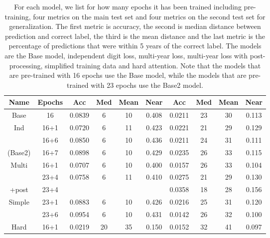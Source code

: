 
\begin{table}
  \centering
  \begin{tabular}{|c|c||c|c|c|c||c|c|c|c|}
    \hline
    Name & Epochs & Acc & Med & Mean & Near & Acc & Med & Mean & Near \\
    \hline
    Base & 16 & 0.0839 & 6 & 10 & 0.408 & 0.0211 & 23 & 30 & 0.113 \\
    \hline
    Ind & 16+1 & 0.0720 & 6 & 11 & 0.423 & 0.0221 & 21 & 29 & 0.129 \\
    & 16+6 & 0.0850 & 6 & 10 & 0.436 & 0.0211 & 24 & 31 & 0.111 \\
    (Base2) & 16+7 & 0.0898 & 6 & 10 & 0.429 & 0.0235 & 26 & 33 & 0.115 \\
    \hline
    Multi & 16+1 & 0.0707 & 6 & 10 & 0.400 & 0.0157 & 26 & 33 & 0.104 \\
    & 23+4 & 0.0758 & 6 & 11 & 0.410 & 0.0275 & 21 & 29 & 0.130 \\
    +post & 23+4 & & & & & 0.0358 & 18 & 28 & 0.156 \\
    \hline
    Simple & 23+1 & 0.0883 & 6 & 10 & 0.426 & 0.0216 & 25 & 31 & 0.120 \\
    & 23+6 & 0.0954 & 6 & 10 & 0.431 & 0.0142 & 26 & 32 & 0.100 \\
    \hline
    Hard & 16+1 & 0.0219 & 20 & 35 & 0.150 & 0.0152 & 32 & 41 & 0.097 \\
    \hline
  \end{tabular}
  \caption{For each model, we list for how many epochs it has been trained including pre-training, four metrics on the main test set and four metrics on the second test set for generalization.
  The first metric is accuracy, the second is median distance between prediction and correct label, the third is the mean distance and the last metric is the percentage of predictions that were within 5 years of the correct label.
  The models are the Base model, independent digit loss, multi-year loss, multi-year loss with post-processing, simplified training data and hard attention.
  Note that the models that are pre-trained with 16 epochs use the Base model, while the models that are pre-trained with 23 epochs use the Base2 model.
  }
  \label{tab:model_overview}
\end{table}
